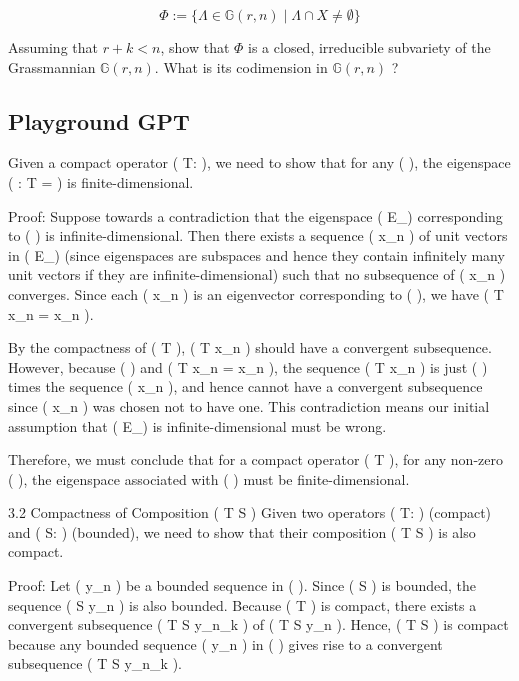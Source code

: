 \documentclass{article}
\begin{document}
$$
\Phi:=\{\Lambda \in \mathbb{G}(r, n) \mid \Lambda \cap X \neq \emptyset\}
$$

Assuming that $r+k<n$, show that $\Phi$ is a closed, irreducible subvariety of the Grassmannian $\mathbb{G}(r, n)$. What is its codimension in $\mathbb{G}(r, n)$ ?


\subsection{Playground GPT}

Given a compact operator ( T:  \rightarrow {} ), we need to show that for any ( \sigma \in {}  ), the eigenspace ( {\psi \in {}: T \psi=\sigma \psi} ) is finite-dimensional.

Proof:
Suppose towards a contradiction that the eigenspace ( E_\sigma ) corresponding to ( \sigma ) is infinite-dimensional. Then there exists a sequence ( { x_n } ) of unit vectors in ( E_\sigma ) (since eigenspaces are subspaces and hence they contain infinitely many unit vectors if they are infinite-dimensional) such that no subsequence of ( { x_n } ) converges. Since each ( x_n ) is an eigenvector corresponding to ( \sigma ), we have ( T x_n = \sigma x_n ).

By the compactness of ( T ), ( { T x_n } ) should have a convergent subsequence. However, because ( \sigma {} ) and ( T x_n = \sigma x_n ), the sequence ( { T x_n } ) is just ( \sigma ) times the sequence ( { x_n } ), and hence cannot have a convergent subsequence since ( { x_n } ) was chosen not to have one. This contradiction means our initial assumption that ( E_\sigma ) is infinite-dimensional must be wrong.

Therefore, we must conclude that for a compact operator ( T ), for any non-zero ( \sigma ), the eigenspace associated with ( \sigma ) must be finite-dimensional.

3.2 Compactness of Composition ( T \circ S )
Given two operators ( T:  \rightarrow {} ) (compact) and ( S:  \rightarrow {} ) (bounded), we need to show that their composition ( T \circ S ) is also compact.

Proof:
Let ( { y_n } ) be a bounded sequence in (  ). Since ( S ) is bounded, the sequence ( { S y_n } ) is also bounded. Because ( T ) is compact, there exists a convergent subsequence ( { T S y_{n_k} } ) of ( { T S y_n } ). Hence, ( T \circ S ) is compact because any bounded sequence ( { y_n } ) in (  ) gives rise to a convergent subsequence ( { T S y_{n_k} } ).
\end{document}
